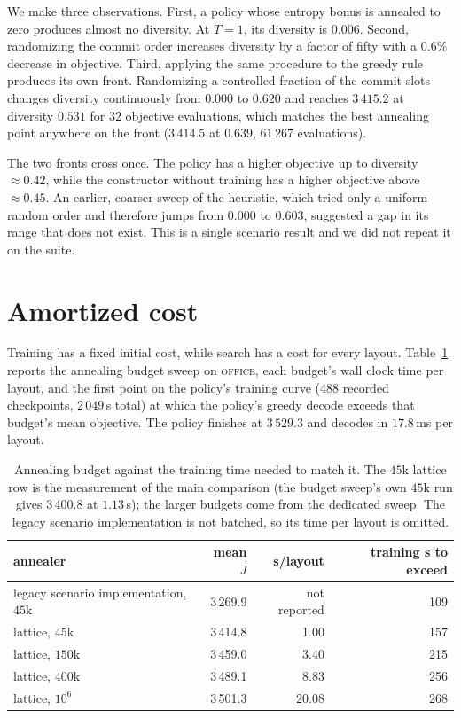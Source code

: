 \documentclass[11pt]{article}
\begin{document}
We make three observations. First, a policy whose entropy bonus is annealed to
zero produces almost no diversity. At $T{=}1$, its diversity is $0.006$. Second,
randomizing the commit order increases diversity by a factor of fifty with a
$0.6\%$ decrease in objective. Third, applying the same procedure to the greedy
rule produces its own front. Randomizing a controlled fraction of the commit
slots changes diversity continuously from $0.000$ to $0.620$ and reaches $3\,415.2$ at
diversity $0.531$ for $32$ objective evaluations, which matches the best
annealing point anywhere on the front ($3\,414.5$ at $0.639$, $61\,267$
evaluations).

The two fronts cross once. The policy has a higher objective up to diversity
$\approx0.42$, while the constructor without training has a higher objective above
$\approx0.45$. An earlier, coarser
sweep of the heuristic, which tried only a uniform random order and therefore
jumps from $0.000$ to $0.603$, suggested a gap in its range that does not
exist. This is a single scenario result and we did not repeat it on the suite.

\section{Amortized cost}
\label{app:amortize}
Training has a fixed initial cost, while search has a cost for every layout.
Table~\ref{tab:amortize} reports the annealing budget sweep on
\textsc{office}, each budget's
wall clock time per layout, and the first point on the policy's training curve
($488$ recorded checkpoints, $2\,049$\,s total) at which the policy's greedy
decode exceeds that budget's mean objective. The policy finishes at $3\,529.3$
and decodes in $17.8$\,ms per layout.

\begin{table}[htbp]
\centering
\caption{Annealing budget against the training time needed to match it. The
$45$k lattice row is the measurement of the main comparison (the budget
sweep's own $45$k run gives $3\,400.8$ at $1.13$\,s); the larger budgets come
from the dedicated sweep. The legacy scenario implementation is not batched, so its
time per layout is omitted.}
\label{tab:amortize}
\footnotesize
\begin{tabular}{@{}lrrr@{}}
\toprule
annealer & mean $J$ & s/layout & training s to exceed \\
\midrule
legacy scenario implementation, $45$k & 3\,269.9 & not reported & 109 \\
lattice, $45$k   & 3\,414.8 & 1.00 & 157 \\
lattice, $150$k  & 3\,459.0 & 3.40 & 215 \\
lattice, $400$k  & 3\,489.1 & 8.83 & 256 \\
lattice, $10^{6}$ & 3\,501.3 & 20.08 & 268 \\
\bottomrule
\end{tabular}
\end{table}
\end{document}

